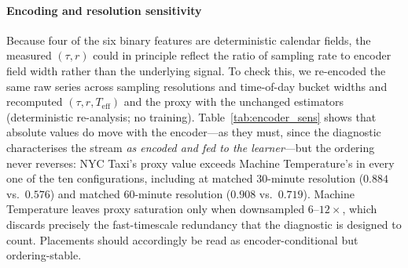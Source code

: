 \documentclass[sensors,article,submit,pdftex,moreauthors]{Definitions/mdpi}
\newcommand{\Teff}{T_{\mathrm{eff}}}
\providecommand{\DIFadd}[1]{{\protect\color{blue}#1}} %
\providecommand{\DIFdel}[1]{} %
\providecommand{\DIFaddbegin}{} %
\providecommand{\DIFaddend}{} %
\providecommand{\DIFdelbegin}{} %
\providecommand{\DIFdelend}{} %
\begin{document}
\DIFdelbegin \DIFdel{The two streams together illustrate the value of the }\DIFdelend \DIFaddbegin \paragraph{\DIFadd{Encoding and resolution sensitivity}} \DIFadd{Because four of the six binary features are deterministic calendar fields, the measured }\DIFaddend $(\tau, r)$ \DIFdelbegin \DIFdel{diagnostic: it identifies real streams that fall on either side of the proxy-favourable boundary using the same estimators applied to }\DIFdelend \DIFaddbegin \DIFadd{could in principle reflect the ratio of sampling rate to encoder field width rather than the underlying signal. To check this, we re-encoded the same raw series across sampling resolutions and time-of-day bucket widths and recomputed $(\tau, r, \Teff)$ and the proxy with the unchanged estimators (deterministic re-analysis; no training). Table~\ref{tab:encoder_sens} shows that absolute values do move with the encoder---as they must, since the diagnostic characterises the stream }\emph{\DIFadd{as encoded and fed to the learner}}\DIFadd{---but the ordering never reverses: NYC Taxi's proxy value exceeds Machine Temperature's in every one of the ten configurations, including at matched 30-minute resolution ($0.884$ vs.\ $0.576$) and matched 60-minute resolution ($0.908$ vs.\ $0.719$). Machine Temperature leaves proxy saturation only when downsampled $6$--$12\times$, which discards precisely the fast-timescale redundancy that the diagnostic is designed to count. Placements should accordingly be read as encoder-conditional but ordering-stable.
}
\end{document}
